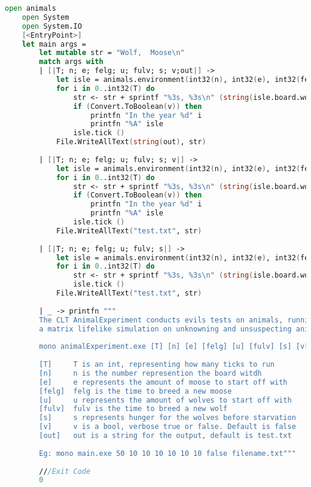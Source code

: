 \begin{lstlisting}[language=FSharp]
    open animals
    open System
    open System.IO
    [<EntryPoint>]
    let main args =
        let mutable str = "Wolf,  Moose\n"
        match args with
        | [|T; n; e; felg; u; fulv; s; v;out|] ->
            let isle = animals.environment(int32(n), int32(e), int32(felg), int32(u), int32(fulv), int32(s), Convert.ToBoolean(v))
            for i in 0..int32(T) do
                str <- str + sprintf "%3s, %3s\n" (string(isle.board.wolves.Length)) (string(isle.board.moose.Length))
                if (Convert.ToBoolean(v)) then
                    printfn "In the year %d" i
                    printfn "%A" isle
                isle.tick ()
            File.WriteAllText(string(out), str)
        
        | [|T; n; e; felg; u; fulv; s; v|] ->
            let isle = animals.environment(int32(n), int32(e), int32(felg), int32(u), int32(fulv), int32(s), Convert.ToBoolean(v))
            for i in 0..int32(T) do
                str <- str + sprintf "%3s, %3s\n" (string(isle.board.wolves.Length)) (string(isle.board.moose.Length))
                if (Convert.ToBoolean(v)) then
                    printfn "In the year %d" i
                    printfn "%A" isle
                isle.tick ()
            File.WriteAllText("test.txt", str)
        
        | [|T; n; e; felg; u; fulv; s|] ->
            let isle = animals.environment(int32(n), int32(e), int32(felg), int32(u), int32(fulv), int32(s), false)
            for i in 0..int32(T) do
                str <- str + sprintf "%3s, %3s\n" (string(isle.board.wolves.Length)) (string(isle.board.moose.Length))
                isle.tick ()
            File.WriteAllText("test.txt", str)
        
        | _ -> printfn """
        The CLT AnimalExperiment conducts evils tests on animals, running
        a matrix lifelike simulation on unknowning and unsuspecting animals!!
    
        mono animalExperiment.exe [T] [n] [e] [felg] [u] [fulv] [s] [v[OPTIONAL]] [out[OPTIONAL]]
    
        [T]     T is an int, representing how many ticks to run
        [n]     n is the number represention the board witdh
        [e]     e represents the amount of moose to start off with
        [felg]  felg is the time to breed a new moose
        [u]     u represents the amount of wolves to start off with
        [fulv]  fulv is the time to breed a new wolf
        [s]     s represents hunger for the wolves before starvation
        [v]     v is a bool, verbose true or false. Default is false
        [out]   out is a string for the output, default is test.txt
    
        Eg: mono main.exe 50 10 10 10 10 10 10 false filename.txt"""
        
        ///Exit Code
        0


\end{lstlisting}